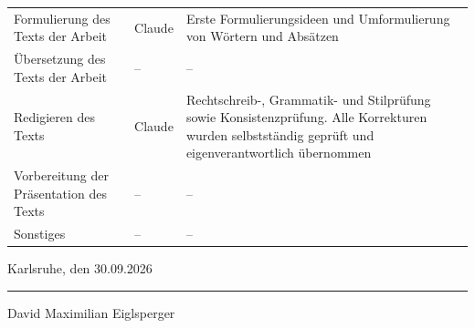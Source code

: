 \documentclass[
  paper=a4,
  fontsize=10pt,
  toc=bib,
  titlepage=firstiscover,
  headings=big
]{scrartcl}
\theoremstyle{definition}
\begin{document}
\begin{longtable}{@{}>{\raggedright\arraybackslash}p{}
                    >{\raggedright\arraybackslash}p{}
                    >{\raggedright\arraybackslash}p{}@{}}
\addlinespace
Formulierung des Texts der Arbeit & Claude &
Erste Formulierungsideen und Umformulierung von W\"ortern und Abs\"atzen \\
\addlinespace
\"Ubersetzung des Texts der Arbeit & -- & -- \\
\addlinespace
Redigieren des Texts & Claude &
Rechtschreib-, Grammatik- und Stilpr\"ufung sowie Konsistenzpr\"ufung. Alle
Korrekturen wurden selbstst\"andig gepr\"uft und eigenverantwortlich
\"ubernommen \\
\addlinespace
Vorbereitung der Pr\"asentation des Texts & -- & -- \\
\addlinespace
Sonstiges & -- & -- \\
\end{longtable}

\vspace{1.0cm}

\noindent
\begin{minipage}[t]{0.45\textwidth}
Karlsruhe, den 30.09.2026
\end{minipage}
\hfill
\begin{minipage}[t]{0.35\textwidth}
\hrule
\vspace{0.3cm}
David Maximilian Eiglsperger
\end{minipage}

\clearpage
\end{document}
